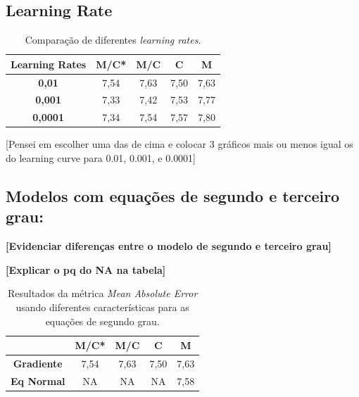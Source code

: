 \documentclass[conference]{IEEEtran}
\begin{document}
\subsection{Learning Rate}


\begin{table}[!h]
	\centering
	
	\begin{tabular}{ccccc} \\ \hline
		\textbf{Learning Rates} & \textbf{M/C*} & \textbf{M/C} & \textbf{C} & \textbf{M} \\ \hline
		\textbf{0,01}   & 7,54          & 7,63         & 7,50       & 7,63       \\
		\textbf{0,001}  & 7,33          & 7,42         & 7,53       & 7,77       \\
		\textbf{0,0001} & 7,34          & 7,54         & 7,57       & 7,80      
	\end{tabular}
	\caption{Comparação de diferentes \emph{learning rates}.}
	\label{tab:comp}
\end{table}


[Pensei em escolher uma das de cima e colocar 3 gráficos mais ou menos igual os do learning curve para 0.01, 0.001, e 0.0001]

\subsection{Modelos com equações de segundo e terceiro grau: }

\textbf{[Evidenciar diferenças entre o modelo de segundo e terceiro grau]}

\textbf{[Explicar o pq do NA na tabela]}

\begin{table}[!h]
	\centering
	
	\begin{tabular}{ccccc} \\ \hline
		\backslashbox{\textbf{Modelos}}{\textbf{Features}} & \textbf{M/C*} & \textbf{M/C} & \textbf{C} & \textbf{M} \\ \hline
		\textbf{Gradiente}      & 7,54     & 7,63         & 7,50       & 7,63  \\  
		\textbf{Eq Normal}      & NA       & NA         & NA       & 7,58   
	\end{tabular}
	\caption{Resultados da métrica \textit{Mean Absolute Error} usando diferentes características para as equações de segundo grau.}
	\label{tab:comp}
\end{table}
\end{document}

